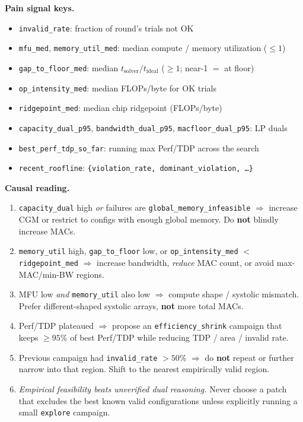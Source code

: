 \begin{tcolorbox}
\medskip \textbf{Pain signal keys.}
\begin{itemize}[leftmargin=1.4em, itemsep=1pt, topsep=2pt]
    \item \texttt{invalid\_rate}: fraction of round's trials not OK
    \item \texttt{mfu\_med}, \texttt{memory\_util\_med}: median compute / memory utilization ($\leq 1$)
    \item \texttt{gap\_to\_floor\_med}: median $t_{\mathrm{solver}} / t_{\mathrm{ideal}}$ ($\geq 1$; near-1 $=$ at floor)
    \item \texttt{op\_intensity\_med}: median FLOPs/byte for OK trials
    \item \texttt{ridgepoint\_med}: median chip ridgepoint (FLOPs/byte)
    \item \texttt{capacity\_dual\_p95}, \texttt{bandwidth\_dual\_p95}, \texttt{macfloor\_dual\_p95}: LP duals
    \item \texttt{best\_perf\_tdp\_so\_far}: running max Perf/TDP across the search
    \item \texttt{recent\_roofline}: \texttt{\{violation\_rate, dominant\_violation, \ldots\}}
\end{itemize}

\medskip \textbf{Causal reading.}
\begin{enumerate}[leftmargin=1.6em, itemsep=2pt, topsep=2pt]
    \item \texttt{capacity\_dual} high \emph{or} failures are
          \texttt{global\_memory\_infeasible} $\Rightarrow$ increase CGM or restrict to configs with enough global memory.
Do \textbf{not} blindly increase MACs.
    \item \texttt{memory\_util} high, \texttt{gap\_to\_floor} low, or
          \texttt{op\_intensity\_med} $<$ \texttt{ridgepoint\_med} $\Rightarrow$ increase bandwidth, \emph{reduce} MAC count, or avoid max-MAC/min-BW regions.
    \item MFU low \emph{and} \texttt{memory\_util} also low $\Rightarrow$
          compute shape / systolic mismatch.
Prefer different-shaped systolic arrays, \textbf{not} more total MACs.
    \item Perf/TDP plateaued $\Rightarrow$ propose an
          \texttt{efficiency\_shrink} campaign that keeps $\geq 95\%$ of best Perf/TDP while reducing TDP / area / invalid rate.
    \item Previous campaign had \texttt{invalid\_rate} $> 50\%$
          $\Rightarrow$ do \textbf{not} repeat or further narrow into that region.
Shift to the nearest empirically valid region.
    \item \emph{Empirical feasibility beats unverified dual reasoning.}
          Never choose a patch that excludes the best known valid configurations unless explicitly running a small \texttt{explore} campaign.
\end{enumerate}


\end{tcolorbox}
